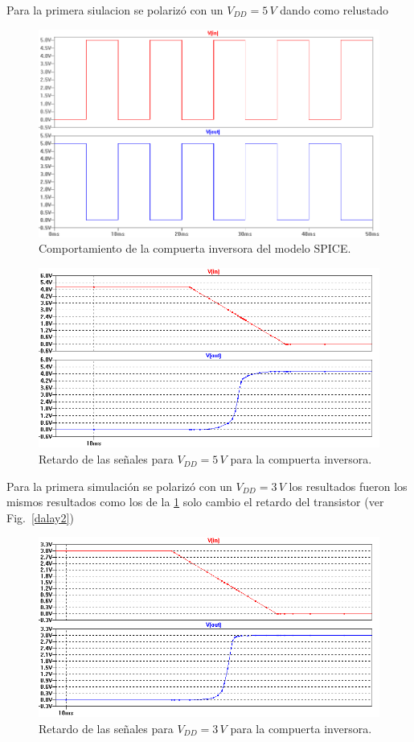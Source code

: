 \documentclass[twocolumn]{IEEEtran}
\begin{document}
\noindent
Para la primera siulacion se polarizó con un $V_{DD} = 5\, V$ dando como relustado
\begin{figure}[H]
  \centering
    \includegraphics[scale=0.3]{pics/outinv.png}
      \caption{Comportamiento de la compuerta inversora del modelo SPICE.}
	\label{outinv}
\end{figure}
\begin{figure}[H]
  \centering
    \includegraphics[scale=0.35]{pics/delay1.png}
      \caption{Retardo de las señales para $V_{DD}=5\, V$ para la compuerta inversora.}
	\label{delay1}
\end{figure}
\noindent
Para la primera simulación se polarizó con un $V_{DD} = 3\, V$ los resultados fueron los mismos resultados como los de la \ref{outinv} solo cambio el retardo del transistor (ver Fig.~\ref{dalay2})
\begin{figure}[H]
  \centering
    \includegraphics[scale=0.32]{pics/delay2.png}
      \caption{Retardo de las señales para $V_{DD}=3\, V$ para la compuerta inversora.}
	\label{delay2}
\end{figure}
\end{document}
